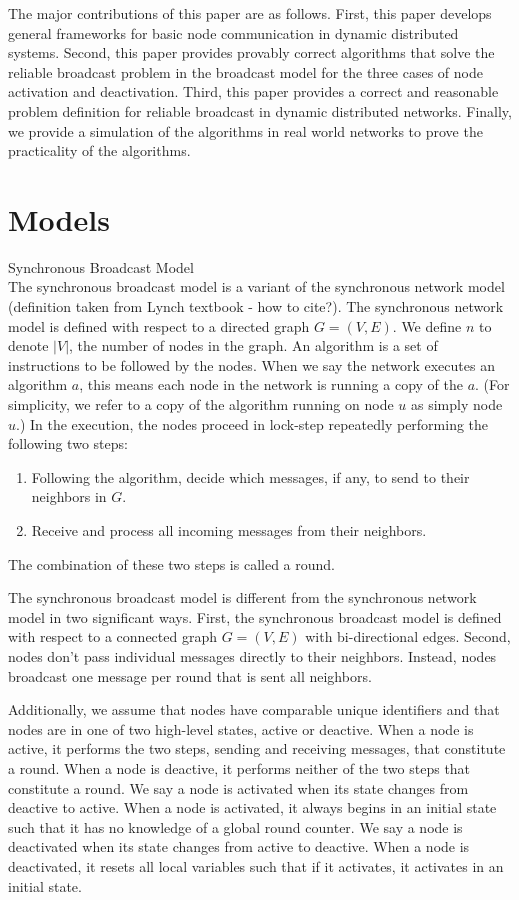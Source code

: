 \documentclass[english]{article}
\begin{document}
The major contributions of this paper are as follows. First, this paper develops general frameworks for basic node communication in dynamic distributed systems. Second, this paper provides provably correct algorithms that solve the reliable broadcast problem in the broadcast model for the three cases of node activation and deactivation. Third, this paper provides a correct and reasonable problem definition for reliable broadcast in dynamic distributed networks. Finally, we provide a simulation of the algorithms in real world networks to prove the practicality of the algorithms. 

\section{Models}

Synchronous Broadcast Model \\

The synchronous broadcast model is a variant of the synchronous network model (definition taken from Lynch textbook - how to cite?). The synchronous network model is defined with respect to a directed graph $G=(V,E)$. We define $n$ to denote $|V|$, the number of nodes in the graph. An algorithm is a set of instructions to be followed by the nodes. When we say the network executes an algorithm $a$, this means each node in the network is running a copy of the $a$. (For simplicity, we refer to a copy of the algorithm running on node $u$ as simply node $u$.) In the execution, the nodes proceed in lock-step repeatedly performing the following two steps:
\begin{enumerate}
  \item Following the algorithm, decide which messages, if any, to send to their neighbors in $G$.
  \item Receive and process all incoming messages from their neighbors.
\end{enumerate}
The combination of these two steps is called a round.

The synchronous broadcast model is different from the synchronous network model in two significant ways. First, the synchronous broadcast model is defined with respect to a connected graph $G=(V,E)$ with bi-directional edges. Second, nodes don't pass individual messages directly to their neighbors. Instead, nodes broadcast one message per round that is sent all neighbors. 

Additionally, we assume that nodes have comparable unique identifiers and that nodes are in one of two high-level states, active or deactive. When a node is active, it performs the two steps, sending and receiving messages, that constitute a round. When a node is deactive, it performs neither of the two steps that constitute a round. We say a node is activated when its state changes from deactive to active. When a node is activated, it always begins in an initial state such that it has no knowledge of a global round counter. We say a node is deactivated when its state changes from active to deactive. When a node is deactivated, it resets all local variables such that if it activates, it activates in an initial state.
\end{document}
